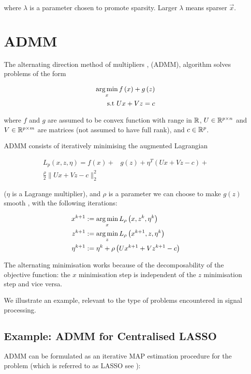\documentclass{article}
\begin{document}
where \(\lambda\) is a parameter chosen to promote sparsity. Larger \(\lambda\) means sparser \(\vec{x}\).

\section{ADMM }\label{sec:admm}
The alternating direction method of multipliers \cite{Boyd2010a}, (ADMM), algorithm solves problems of the form

\begin{align}
\operatorname*{arg\,min}_{x} f\left( x \right) + g\left(z\right) \nonumber
\\
\text{s.t } Ux +Vz = c
\label{admm}
\end{align}

where \(f\) and \(g\) are assumed to be convex function with range in \({\mathbb{R}}\), \(U \in {\mathbb{R}}^{p \times n}\) and \(V\in {\mathbb{R}}^{p \times m}\) are matrices (not assumed to have full rank), and \(c \in {\mathbb{R}}^p\).

ADMM consists of iteratively minimising the augmented Lagrangian 

\begin{align*}
L_p\left(x, z, \eta\right) = f\left( x\right) +& g\left(z\right)+\eta^T\left(Ux+Vz-c\right) + \\ \frac{\rho}{2}\|Ux+Vz-c\|_2^2
\label{admm_form}
\end{align*}

(\(\eta\) is a Lagrange multiplier), and \(\rho\) is a parameter we can choose to make \(g(z)\) smooth \cite{nesterov2005smooth}, with the following iterations:

\begin{align}
x^{k+1} &:= \operatorname*{arg\,min}_{x} L_\rho\left(x,z^k,\eta^k\right)\\
z^{k+1} &:= \operatorname*{arg\,min}_{z} L_\rho\left(x^{k+1},z,\eta^k\right)\\
\eta^{k+1} &:= \eta^{k} + \rho \left(Ux^{k+1} + Vz^{k+1} - c\right)
\label{admm_algo}
\end{align}

The alternating minimisation works because of the decomposability of the objective function: the \(x\) minimisation step is independent of the \(z\) minimisation step and vice versa.  

We illustrate an example, relevant to the type of problems encountered in signal processing.

\subsection{Example: ADMM for Centralised LASSO}
ADMM can be formulated as an iterative MAP estimation procedure for the problem (which is referred to as LASSO see \cite{tibshirani1996regression}):
\end{document}

